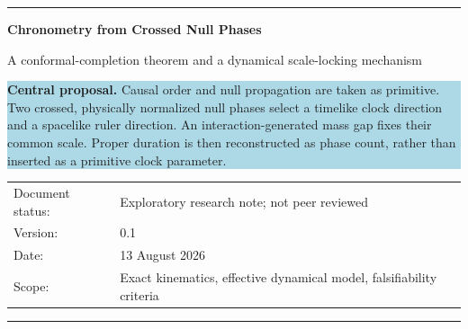 \documentclass[11pt,a4paper]{article}
\begin{document}

\begin{titlepage}
\thispagestyle{empty}
\vspace*{18mm}

{\color{navy}\rule{\textwidth}{1.2pt}}
\vspace{8mm}

{\fontsize{24}{29}\selectfont\bfseries\color{navy} Chronometry from Crossed Null Phases\par}
\vspace{4mm}
{\Large A conformal-completion theorem and a dynamical scale-locking mechanism\par}

\vspace{12mm}

\begin{center}
\begin{minipage}{0.88\textwidth}
\colorbox{lightblue}{\parbox{0.94\textwidth}{
\textbf{Central proposal.} Causal order and null propagation are taken as primitive. Two crossed, physically normalized null phases select a timelike clock direction and a spacelike ruler direction. An interaction-generated mass gap fixes their common scale. Proper duration is then reconstructed as phase count, rather than inserted as a primitive clock parameter.
}}
\end{minipage}
\end{center}

\vfill

\begin{tabular}{@{}ll@{}}
Document status: & Exploratory research note; not peer reviewed \\
Version: & 0.1 \\
Date: & 13 August 2026 \\
Scope: & Exact kinematics, effective dynamical model, falsifiability criteria
\end{tabular}

\vspace{10mm}
{\color{navy}\rule{\textwidth}{1.2pt}}
\end{titlepage}
\end{document}
